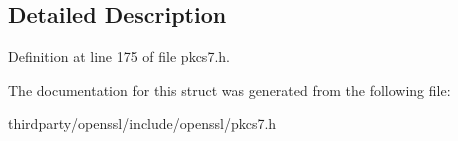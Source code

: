 \subsection{Detailed Description}


Definition at line 175 of file pkcs7.\+h.



The documentation for this struct was generated from the following file\+:\begin{DoxyCompactItemize}
\item 
thirdparty/openssl/include/openssl/pkcs7.\+h\end{DoxyCompactItemize}
